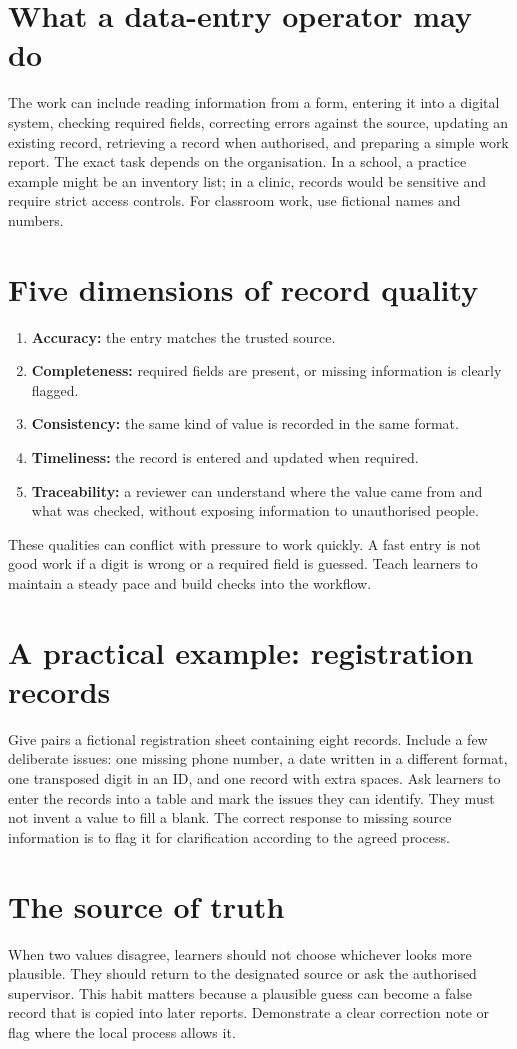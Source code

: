 \documentclass[11pt,openany,oneside]{book}
\begin{document}
\section{What a data-entry operator may do}
The work can include reading information from a form, entering it into a digital system, checking required fields, correcting errors against the source, updating an existing record, retrieving a record when authorised, and preparing a simple work report. The exact task depends on the organisation. In a school, a practice example might be an inventory list; in a clinic, records would be sensitive and require strict access controls. For classroom work, use fictional names and numbers.
\section{Five dimensions of record quality}
\begin{enumerate}
\item \textbf{Accuracy:} the entry matches the trusted source.
\item \textbf{Completeness:} required fields are present, or missing information is clearly flagged.
\item \textbf{Consistency:} the same kind of value is recorded in the same format.
\item \textbf{Timeliness:} the record is entered and updated when required.
\item \textbf{Traceability:} a reviewer can understand where the value came from and what was checked, without exposing information to unauthorised people.
\end{enumerate}
These qualities can conflict with pressure to work quickly. A fast entry is not good work if a digit is wrong or a required field is guessed. Teach learners to maintain a steady pace and build checks into the workflow.
\section{A practical example: registration records}
Give pairs a fictional registration sheet containing eight records. Include a few deliberate issues: one missing phone number, a date written in a different format, one transposed digit in an ID, and one record with extra spaces. Ask learners to enter the records into a table and mark the issues they can identify. They must not invent a value to fill a blank. The correct response to missing source information is to flag it for clarification according to the agreed process.
\section{The source of truth}
When two values disagree, learners should not choose whichever looks more plausible. They should return to the designated source or ask the authorised supervisor. This habit matters because a plausible guess can become a false record that is copied into later reports. Demonstrate a clear correction note or flag where the local process allows it.
\end{document}
